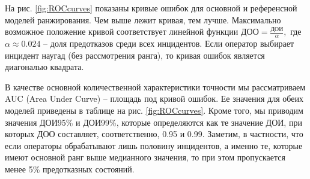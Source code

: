На рис. \ref{fig:ROCcurves} показаны кривые ошибок для основной и референсной моделей ранжирования. Чем выше лежит кривая, тем лучше. Максимально возможное положение кривой соответствует линейной функции $\text{ДОО}=\frac{ДОИ}{\alpha},$ где $\alpha\approx 0.024$ -- доля предотказов среди всех инцидентов. Если оператор выбирает инцидент наугад (без рассмотрения ранга), то кривая ошибок является диагональю квадрата.

В качестве основной количественной характеристики точности мы рассматриваем AUC (Area Under Curve) -- площадь под кривой ошибок. Ее значения для обеих моделей приведены в таблице на рис. \ref{fig:ROCcurves}. Кроме того, мы приводим значения ДОИ95\% и ДОИ99\%, которые определяются как те значение ДОИ, при которых ДОО составляет, соответственно, 0.95 и 0.99. Заметим, в частности, что если операторы обрабатывают лишь половину инцидентов, а именно те, которые имеют основной ранг выше медианного значения, то при этом пропускается менее 5\% предотказных состояний.


